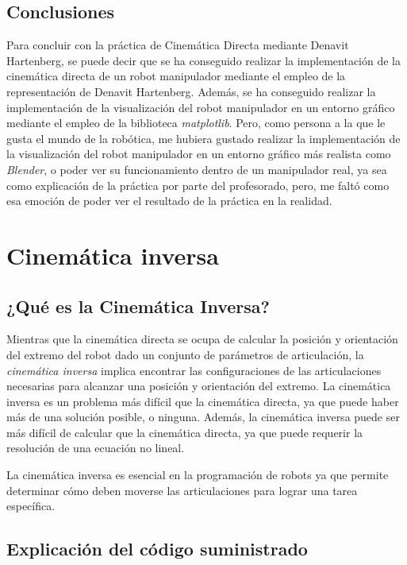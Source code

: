 \documentclass[11pt]{report}
\begin{document}
\section{Conclusiones}

Para concluir con la práctica de Cinemática Directa mediante Denavit Hartenberg, se puede decir que se ha conseguido realizar la implementación de la cinemática directa de un robot manipulador mediante el empleo de la representación de Denavit Hartenberg. Además, se ha conseguido realizar la implementación de la visualización del robot manipulador en un entorno gráfico mediante el empleo de la biblioteca \emph{matplotlib}. Pero, como persona a la que le gusta el mundo de la robótica, me hubiera gustado realizar la implementación de la visualización del robot manipulador en un entorno gráfico más realista como \emph{Blender}, o poder ver su funcionamiento dentro de un manipulador real, ya sea como explicación de la práctica por parte del profesorado, pero, me faltó como esa emoción de poder ver el resultado de la práctica en la realidad.

\chapter{Cinemática inversa}

\section{¿Qué es la Cinemática Inversa?}

Mientras que la cinemática directa se ocupa de calcular la posición y orientación del extremo del robot dado un conjunto de parámetros de articulación, la \emph{cinemática inversa} implica encontrar las configuraciones de las articulaciones necesarias para alcanzar una posición y orientación del extremo. La cinemática inversa es un problema más difícil que la cinemática directa, ya que puede haber más de una solución posible, o ninguna. Además, la cinemática inversa puede ser más difícil de calcular que la cinemática directa, ya que puede requerir la resolución de una ecuación no lineal.

La cinemática inversa es esencial en la programación de robots ya que permite determinar cómo deben moverse las articulaciones para lograr una tarea específica.

\section{Explicación del código suministrado}
\end{document}
